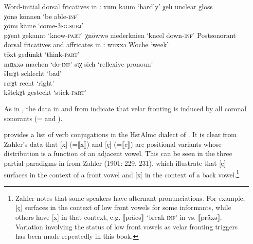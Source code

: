 {\ea%
\label{ex:15:34}Word-initial dorsal fricatives in :
\ea\label{ex:15:34a} xūm \tab [xuːm] \tab kaum \tab ‘hardly’ 
\ex\label{ex:15:34b} χelɩ \tab [çelɪ]\tab unclear gloss \tab ~  \\
    χönə \tab [çønə] \tab können \tab ‘be able-\textsc{inf}’ \\
    χömɩ \tab [çømɪ] \tab käme \tab ‘come-\textsc{3}\textsc{sg}.\textsc{subj}’ \\
    pχent \tab [pçent] \tab gekannt \tab ‘know-\textsc{part}’ 
\ex\label{ex:15:34c} χnöwwə \tab [çnøwwə] \tab niederknien \tab ‘kneel down-\textsc{inf}’ 
\z 
\ex%
\label{ex:15:35}Postsonorant dorsal fricatives and affricates in :
\ea\label{ex:15:35a} wuxxə \tab [wuxxə] \tab Woche \tab ‘week’ \\
    tōxt  \tab  [toːxt] \tab gedünkt \tab ‘think-\textsc{part}’ \\
    mɑxxə \tab [mɑxxə] \tab machen \tab ‘do-\textsc{inf}’ 
\ex\label{ex:15:35b} sɩχ  \tab  [sɪç] \tab sich \tab ‘reflexive pronoun’ \\
    šlæχt \tab [ʃlæçt] \tab schlecht \tab ‘bad’ \\
    ræχt \tab [ræçt] \tab recht \tab ‘right’ \\
    kštekχt \tab [kʃtekçt] \tab gesteckt \tab ‘stick-\textsc{part}’ 
\z 
\z 

As in , the data in  and  from  indicate that velar fronting is induced by all coronal sonorants (= and ).

\citet{Zahler1901} provides a list of verb conjugations in the HstAlmc dialect of .  It is clear from Zahler’s data that [x] (=⟦x⟧) and [ç] (=⟦c⟧) are positional variants whose distribution is a function of an adjacent vowel. This can be seen in the three partial paradigms in  from Zahler (1901: 229, 231), which illustrate that [ç] surfaces in the context of a front vowel and [x] in the context of a back vowel.\footnote{{Zahler notes that some speakers have alternant pronunciations. For example, [ç] surfaces in the context of low front vowels for some informants, while others have [x] in that context, e.g. ⟦präcə⟧ ‘break-}\textrm{\textsc{inf}}\textrm{’ in  vs. ⟦präxə⟧. Variation involving the status of low front vowels as velar fronting triggers has been made repeatedly in this book.}}

}
